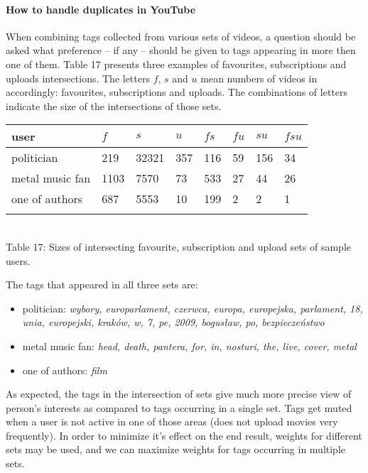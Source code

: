 \paragraph{How to handle duplicates in YouTube}

When combining tags collected from various sets of videos, a question should be
asked what preference -- if any -- should be given to tags appearing in more
then one of them. Table 17 presents three examples of favourites,
subscriptions and uploads intersections. The letters $f$, $s$ and $u$ mean
numbers of videos in accordingly: favourites, subscriptions and uploads. The
combinations of letters indicate the size of the intersections of those sets. \\

\begin{center}
\begin{tabular}{| l | l | l | l | l | l | l | l |}
user & $f$ & $s$ & $u$ & $fs$ & $fu$ & $su$ & $fsu$ \\ \hline
politician & 219 & 32321 & 357 & 116 & 59 & 156 & 34 \\
metal music fan & 1103 & 7570 & 73 & 533 & 27 & 44 & 26 \\
one of authors & 687 & 5553 & 10 & 199 & 2 & 2 & 1 \\
\label{intersections}
\end{tabular} \\
Table 17: Sizes of intersecting favourite, subscription and upload sets of sample users. \\
\end{center}

The tags that appeared in all three sets are:
\begin{itemize}
  \item{politician: \emph{wybory, europarlament, czerwca, europa, europejska,
  parlament, 18, unia, europejski, kraków, w, 7, pe, 2009, bogusław, po,
  bezpieczeństwo}}
  \item{metal music fan: \emph{head, death, pantera, for, in, nosturi, the, live, cover, metal}}
  \item{one of authors: \emph{film}}
\end{itemize}

As expected, the tags in the intersection of sets give much more precise view of person's
interests as compared to tags occurring in a single set. Tags get muted when a user is not active in one of
those areas (\eg does not upload movies very frequently). In order to minimize it's effect on the
end result, weights for different sets may be used, and we can maximize weights for tags occurring
in multiple sets.


